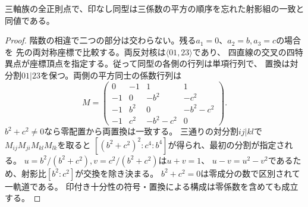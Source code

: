 \begin{corollary}[階数8の座標境界の同型]
三軸族の全正則点で、印なし同型は三係数の平方の順序を忘れた射影組の一致と同値である。
\end{corollary}
\begin{proof}
階数の相違で二つの部分は交わらない。残る$a_1=0$、$a_2=b,a_3=c$の場合を
先の両対称座標で比較する。両反対核は$\langle 01,23\rangle$であり、
四直線の交叉の四特異点が座標頂点を指定する。従って同型の各側の行列は単項行列で、
置換は対分割$01|23$を保つ。両側の平方同士の係数行列は
\[
 M=\begin{pmatrix}0&-1&1&1\\-1&0&-b^2&-c^2\\
 -1&b^2&0&-b^2-c^2\\-1&c^2&-b^2-c^2&0\end{pmatrix}.
\]
$b^2+c^2\ne0$なら零配置から両置換は一致する。
三通りの対分割$ij|kl$で$M_{ij}M_{ji}M_{kl}M_{lk}$を取ると
$[(b^2+c^2)^2:c^4:b^4]$が得られ、最初の分割が指定される。
$u=b^2/(b^2+c^2),v=c^2/(b^2+c^2)$は$u+v=1$、
$u-v=u^2-v^2$であるため、射影比$[b^2:c^2]$が交換を除き決まる。
$b^2+c^2=0$は零成分の数で区別されて一軌道である。
印付き十分性の符号・置換による構成は零係数を含めても成立する。
\end{proof}
